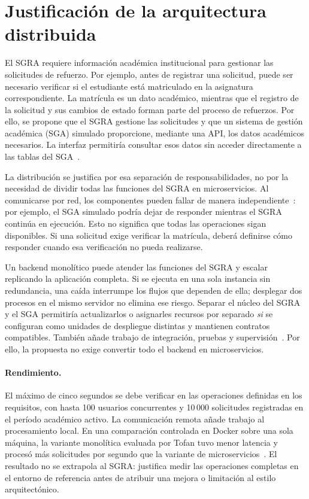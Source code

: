 \section{Justificación de la arquitectura distribuida}

El SGRA requiere información académica institucional para gestionar las solicitudes de refuerzo. Por ejemplo, antes de registrar una solicitud, puede ser necesario verificar si el estudiante está matriculado en la asignatura correspondiente. La matrícula es un dato académico, mientras que el registro de la solicitud y sus cambios de estado forman parte del proceso de refuerzos. Por ello, se propone que el SGRA gestione las solicitudes y que un sistema de gestión académica (SGA) simulado proporcione, mediante una API, los datos académicos necesarios. La interfaz permitiría consultar esos datos sin acceder directamente a las tablas del SGA~\cite{swebok-v40a,kazanavicius2022-database}.

La distribución se justifica por esa separación de responsabilidades, no por la necesidad de dividir todas las funciones del SGRA en microservicios. Al comunicarse por red, los componentes pueden fallar de manera independiente~\cite{fu2025-distmeasure,vansteen2023-distributed}: por ejemplo, el SGA simulado podría dejar de responder mientras el SGRA continúa en ejecución. Esto no significa que todas las operaciones sigan disponibles. Si una solicitud exige verificar la matrícula, deberá definirse cómo responder cuando esa verificación no pueda realizarse.

Un backend monolítico puede atender las funciones del SGRA y escalar replicando la aplicación completa. Si se ejecuta en una sola instancia sin redundancia, una caída interrumpe los flujos que dependen de ella; desplegar dos procesos en el mismo servidor no elimina ese riesgo. Separar el núcleo del SGRA y el SGA permitiría actualizarlos o asignarles recursos por separado \emph{si} se configuran como unidades de despliegue distintas y mantienen contratos compatibles. También añade trabajo de integración, pruebas y supervisión~\cite{soylemez2022-challenges,ayas2023-migration}. Por ello, la propuesta no exige convertir todo el backend en microservicios.

\paragraph{Rendimiento.}
El máximo de cinco segundos se debe verificar en las operaciones definidas en los requisitos, con hasta 100 usuarios concurrentes y 10\,000 solicitudes registradas en el período académico activo. La comunicación remota añade trabajo al procesamiento local. En una comparación controlada en Docker sobre una sola máquina, la variante monolítica evaluada por Tofan tuvo menor latencia y procesó más solicitudes por segundo que la variante de microservicios~\cite{tofan2026-tail}. El resultado no se extrapola al SGRA: justifica medir las operaciones completas en el entorno de referencia antes de atribuir una mejora o limitación al estilo arquitectónico.

